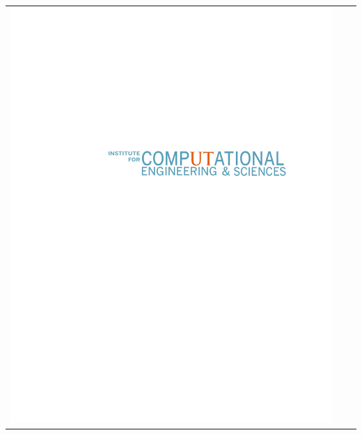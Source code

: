 \documentclass[final]{beamer}
\newlength{\onecolwid}
\begin{document}
\begin{frame}[t]
\begin{columns}[t]
\begin{column}{\onecolwid}
%
%

\vspace{-6ex}

\begin{center}
\begin{tabular}{ccc}
\includegraphics[trim=3.0in 7.2in 1.5in 4.0in,width=0.9\linewidth]{logos/ICES-wordmark-teal.pdf}
\end{tabular}
\end{center}



\end{column}
\end{columns}
\end{frame}
\end{document}
